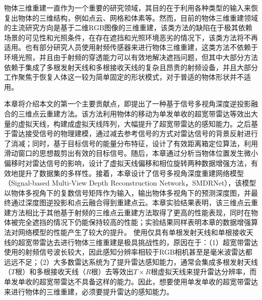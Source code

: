 \label{chapter:ch3}
物体三维重建一直作为一个重要的研究领域，其目的在于利用各种类型的输入来恢复出物体的三维结构，例如点云、网格和体素等。然而，目前的物体三维重建领域的主流研究方向是基于二维RGB图像的三维重建，该类方法的缺陷在于极其依赖场景的可见性和光照条件，在存在遮挡和光照环境恶劣的情况下，该类方法将不再适用。也有部分研究人员使用射频传感器来进行物体三维重建，这类方法不依赖于环境光照，并且由于射频的穿透能力可以有效地解决遮挡问题，但其中大部分方法依赖于集成了多根发射天线和多根接收天线的复杂且昂贵的射频设备，并且大部分工作聚焦于恢复人体这一较为简单固定的形状模式，对于普适的物体形状并不适用。

本章将介绍本文的第一个主要贡献点，即提出了一种基于信号多视角深度逆投影融合的三维点云重建方法。该方法利用物体的移动为单发单收的超宽带雷达等效出大量的虚拟天线，构建成虚拟天线阵列，大幅提升了超宽带雷达的感知能力。之后基于雷达接受信号的物理建模，通过减去参考信号的方式对雷达信号的背景反射进行了消减；同时，基于目标信号的能量分布特征，设计了有效距离箱定位算法，利用滑动窗口的思想裁剪出有效的目标信号。随后，本章通过分析当物体位置发生微小偏移时对雷达信号的影响，设计了虚拟天线偏移和相位旋转两种数据增强方法，有效地提升了数据集的多样性。接着，本章设计了信号多视角深度重建网络模型（Signal-based Multi-View Depth Reconstruction Network，SMDRNet），该模型以物体多视角下的复数信号矩阵作为输入，输出物体多视角下的预测深度图，并最终通过深度图逆投影和点云融合得到重建点云。本章实验结果表明，该三维点云重建方法相比于其他基于射频的三维点云重建方法取得了更高的性能表现，同时在物体被完全遮挡的情况下仍能保持较高的性能；实验结果同样表明本章的数据增强算法对网络模型的性能产生了较大的提升。
使用仅具有单根发射天线和单根接收天线的超宽带雷达去进行物体三维重建是极具挑战性的，原因在于：（1）超宽带雷达使用的射频信号波长较大，因此感知分辨率相较于RGB相机甚至是毫米波雷达都远远不足；（2）大多数雷达系统为了提升雷达感知能力，通常会集成多根发射天线（$T$根）和多根接收天线（$R$根）去等效出$T\times R$根虚拟天线来提升雷达分辨率，而单发单收的超宽带雷达不具备这样的能力。因此，想要使用单发单收的超宽带雷达来进行物体的三维重建，必须要提升雷达的感知能力。

